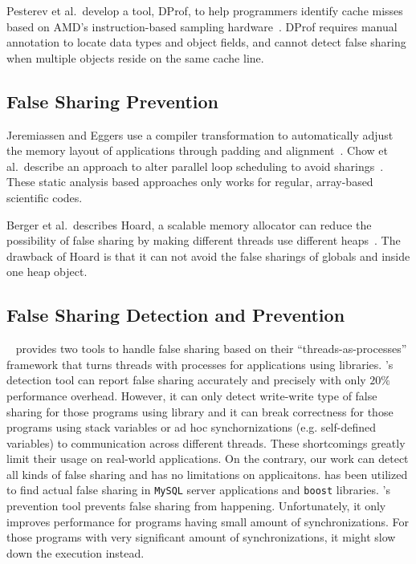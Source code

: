 Pesterev et al.\ develop a tool, DProf, to help programmers identify cache misses based on
AMD's instruction-based sampling hardware~\cite{DProf}.
DProf requires manual annotation
to locate data types and object fields, and cannot detect false
sharing when multiple objects reside on the same cache line.

\subsection{False Sharing Prevention}
Jeremiassen and Eggers use a compiler transformation to automatically adjust the
memory layout of applications through padding and alignment~\cite{falseshare:compile}.
Chow et al.\ describe an approach to alter parallel loop scheduling to avoid
sharings~\cite{falseshare:schedule}.
These static analysis based approaches only works for regular,
array-based scientific codes.

Berger et al.\ describes Hoard, a scalable memory allocator can reduce
the possibility of false sharing
by making different threads use different heaps~\cite{Hoard}.
The drawback of Hoard is that it can not avoid the false sharings of globals and inside one heap object.

\subsection{False Sharing Detection and Prevention}
\sheriff{}~\cite{sheriff} provides two tools to handle false sharing based on 
their ``threads-as-processes'' framework that turns threads with processes for applications using 
\pthreads{} libraries.
\Sheriff{}'s detection tool 
can report false sharing accurately and precisely with only $20\%$ performance overhead.
However, it can only detect write-write type of false sharing for those programs 
using \pthreads{} library and it can break correctness for those programs using 
stack variables or ad hoc synchornizations (e.g. self-defined variables)
to communication across different threads.
These shortcomings greatly limit their usage on real-world applications.  
On the contrary, our work can detect all kinds of false sharing and has no limitations on applicaitons.
\Predator{} has been utilized to find actual false sharing in \texttt{MySQL} server applications 
and \texttt{boost} libraries.
\Sheriff{}'s prevention tool prevents false sharing  from happening. 
Unfortunately, it only improves performance for programs having small amount of synchronizations. 
For those programs with very significant 
amount of synchronizations, it might slow down the execution instead.

